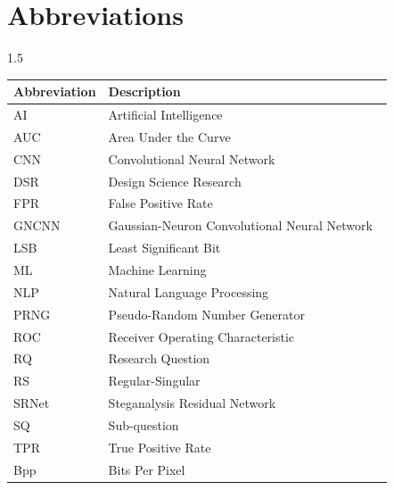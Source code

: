 \chapter*{Abbreviations} 

\begin{spacing}{1.5}
  \begin{longtable}{>{\raggedright\arraybackslash}p{0.25\linewidth}>{\raggedright\arraybackslash}p{0.75\linewidth}}
    \textbf{Abbreviation} & \textbf{Description} \\
    \hline
    AI & Artificial Intelligence \\
    AUC & Area Under the Curve \\
    CNN & Convolutional Neural Network \\
    DSR & Design Science Research \\
    FPR & False Positive Rate \\
    GNCNN & Gaussian-Neuron Convolutional Neural Network \\
    LSB & Least Significant Bit \\
    ML & Machine Learning \\
    NLP & Natural Language Processing \\
    PRNG & Pseudo-Random Number Generator \\
    ROC & Receiver Operating Characteristic \\
    RQ & Research Question \\
    RS & Regular-Singular \\
    SRNet & Steganalysis Residual Network \\
    SQ & Sub-question \\
    TPR & True Positive Rate \\
    Bpp & Bits Per Pixel \\
  \end{longtable}
\end{spacing}
